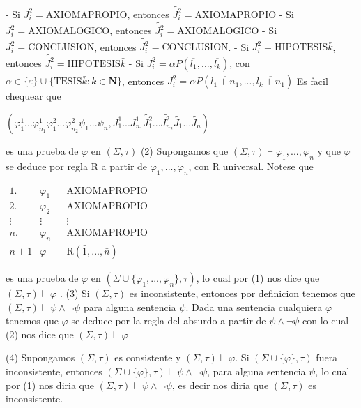 - Si \(J_{i}^{2}=\mathrm{AXIOMAPROPIO}\), entonces \(\widetilde{J_{i}^{2} }=\mathrm{AXIOMAPROPIO}\)
- Si \(J_{i}^{2}=\mathrm{AXIOMALOGICO}\), entonces \(\widetilde{J_{i}^{2} }=\mathrm{AXIOMALOGICO}\)
- Si \(J_{i}^{2}=\mathrm{CONCLUSION}\), entonces \(\widetilde{J_{i}^{2}}= \mathrm{CONCLUSION}\).
- Si \(J_{i}^{2}=\mathrm{HIPOTESIS}\bar{k}\), entonces \(\widetilde{ J_{i}^{2}}=\mathrm{HIPOTESIS}\bar{k}\)
- Si \(J_{i}^{2}=\alpha P(\overline{l_{1}},...,\overline{l_{k}})\), con \(\alpha \in \{\varepsilon \}\cup \{\mathrm{TESIS}\bar{k}:k\in \mathbf{N}\}\), entonces \(\widetilde{J_{i}^{2}}=\alpha P(\overline{l_{1}+n_{1}},..., \overline{l_{k}+n_{1}})\)
Es facil chequear que

\(\displaystyle (\varphi _{1}^{1}...\varphi _{n_{1}}^{1}\varphi _{1}^{2}...\varphi _{n_{2}}^{2}\psi _{1}...\psi _{n},J_{1}^{1}...J_{n_{1}}^{1}\widetilde{ J_{1}^{2}}...\widetilde{J_{n_{2}}^{2}}\widetilde{J_{1}}...\widetilde{J_{n}}) \)

es una prueba de \(\varphi \) en \((\Sigma ,\tau )\)
(2) Supongamos que \((\Sigma ,\tau )\vdash \varphi _{1},...,\varphi _{n}\) y que \(\varphi \) se deduce por regla R a partir de \(\varphi _{1},...,\varphi _{n}\), con R universal. Notese que

\(\displaystyle \begin{array}{llll} 1.\; & \varphi _{1} & & \text{AXIOMAPROPIO} \\ 2.\; & \varphi _{2} & & \text{AXIOMAPROPIO} \\ \vdots & \vdots & & \vdots \\ n. & \varphi _{n} & & \text{AXIOMAPROPIO} \\ n+1 & \varphi & & \text{R}(\bar{1},...,\bar{n}) \end{array} \)

es una prueba de \(\varphi \) en \((\Sigma \cup \{\varphi _{1},...,\varphi _{n}\},\tau )\), lo cual por (1) nos dice que \((\Sigma ,\tau )\vdash \varphi \) .
(3) Si \((\Sigma ,\tau )\) es inconsistente, entonces por definicion tenemos que \((\Sigma ,\tau )\vdash \psi \wedge \lnot \psi \) para alguna sentencia \( \psi \). Dada una sentencia cualquiera \(\varphi \) tenemos que \(\varphi \) se deduce por la regla del absurdo a partir de \(\psi \wedge \lnot \psi \) con lo cual (2) nos dice que \((\Sigma ,\tau )\vdash \varphi \)

(4) Supongamos \((\Sigma ,\tau )\) es consistente y \((\Sigma ,\tau )\vdash \varphi \). Si \((\Sigma \cup \{\varphi \},\tau )\) fuera inconsistente, entonces \((\Sigma \cup \{\varphi \},\tau )\vdash \psi \wedge \lnot \psi \), para alguna sentencia \(\psi \), lo cual por (1) nos diria que \((\Sigma ,\tau )\vdash \psi \wedge \lnot \psi \), es decir nos diria que \((\Sigma ,\tau )\) es inconsistente.


